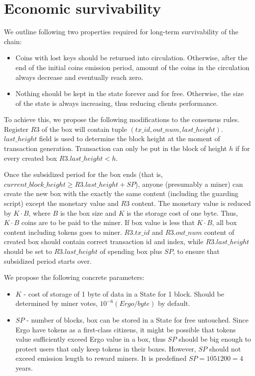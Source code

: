 \section{Economic survivability}

We outline following two properties required for long-term survivability of the chain:

\begin{itemize}
    \item{} Coins with lost keys should be returned into circulation.
    Otherwise, after the end of the initial coins emission period, amount of the coins
    in the circulation always decrease and eventually reach zero.
    \item{} Nothing should be kept in the state forever and for free.
    Otherwise, the size of the state is always increasing, thus reducing clients performance.
\end{itemize}

To achieve this, we propose the following modifications to the consensus rules.
Register $R3$ of the box will contain tuple $(tx\_id, out\_num,
last\_height)$. $last\_height$ field is used to determine the block height
at the moment of transaction generation. Transaction can only be put in the
block of height $h$ if for every created box $R3.last\_height < h$.

Once the subsidized period for the box ends (that is,
$current\_block\_height \ge R3.last\_height + SP$), anyone (presumably a miner) can
create the new box with the exactly the same content (including the guarding
script) except the monetary value and $R3$ content. The monetary value is
reduced by $K \cdot B$, where $B$ is the box size and $K$ is the storage cost of one byte.
Thus, $K \cdot B$ coins are to be paid to the miner.
If box value is less that $K \cdot B$, all box content including tokens goes to miner.
$R3.tx\_id$ and $R3.out\_num$ content of created box should contain correct transaction id
and index, while $R3.last\_height$ should be set to $R3.last\_height$ of spending box
plus $SP$, to ensure that subsidized period starts over.

We propose the following concrete parameters:
\begin{itemize}
    \item{} $K$ - cost of storage of 1 byte of data in a State for 1 block.
    Should be determined by miner votes, $10^{-6} (Ergo/byte)$ by default.
    \item{} $SP$ - number of blocks, box can be stored in a State for free untouched.
    Since Ergo have tokens as a first-class citizens, it might be possible that tokens value
    sufficiently exceed Ergo value in a box, thus $SP$ should be big enough to protect users
    that only keep tokens in their boxes.
    However, $SP$ should not exceed emission length to reward miners.
    It is predefined $SP = 1051200 = 4$ years.
\end{itemize}